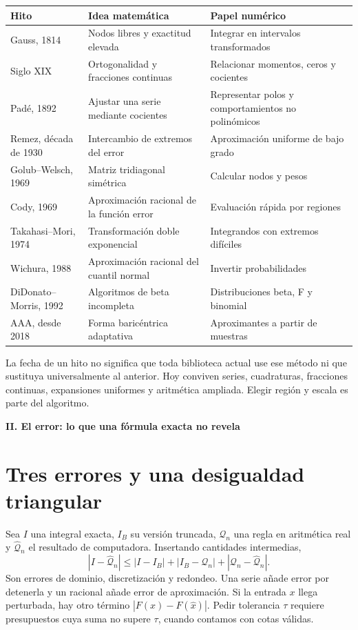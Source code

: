 \documentclass[11pt,a4paper]{article}
\theoremstyle{definition}
\newcommand{\parte}[1]{\par\bigskip\Needspace{8\baselineskip}\begin{center}{\Large\bfseries\color{azul}#1}\end{center}}
\begin{document}
\begin{center}\small
\begin{tabular}{>{\raggedright\arraybackslash}p{2cm}>{\raggedright\arraybackslash}p{5.3cm}>{\raggedright\arraybackslash}p{7.3cm}}
\toprule Hito & Idea matemática & Papel numérico\\\midrule
Gauss, 1814 & Nodos libres y exactitud elevada & Integrar en intervalos transformados\\
Siglo XIX & Ortogonalidad y fracciones continuas & Relacionar momentos, ceros y cocientes\\
Padé, 1892 & Ajustar una serie mediante cocientes & Representar polos y comportamientos no polinómicos\\
Remez, década de 1930 & Intercambio de extremos del error & Aproximación uniforme de bajo grado\\
Golub--Welsch, 1969 & Matriz tridiagonal simétrica & Calcular nodos y pesos\\
Cody, 1969 & Aproximación racional de la función error & Evaluación rápida por regiones\\
Takahasi--Mori, 1974 & Transformación doble exponencial & Integrandos con extremos difíciles\\
Wichura, 1988 & Aproximación racional del cuantil normal & Invertir probabilidades\\
DiDonato--Morris, 1992 & Algoritmos de beta incompleta & Distribuciones beta, F y binomial\\
AAA, desde 2018 & Forma baricéntrica adaptativa & Aproximantes a partir de muestras\\
\bottomrule
\end{tabular}
\end{center}
La fecha de un hito no significa que toda biblioteca actual use ese método ni que sustituya universalmente al anterior. Hoy conviven series, cuadraturas, fracciones continuas, expansiones uniformes y aritmética ampliada. Elegir región y escala es parte del algoritmo.

\parte{II. El error: lo que una fórmula exacta no revela}
\section{Tres errores y una desigualdad triangular}
Sea $I$ una integral exacta, $I_B$ su versión truncada, $\mathcal Q_n$ una regla en aritmética real y $\widehat{\mathcal Q}_n$ el resultado de computadora. Insertando cantidades intermedias,
\[
|I-\widehat{\mathcal Q}_n|
\le |I-I_B|+|I_B-\mathcal Q_n|+|\mathcal Q_n-\widehat{\mathcal Q}_n|.
\]
Son errores de dominio, discretización y redondeo. Una serie añade error por detenerla y un racional añade error de aproximación. Si la entrada $x$ llega perturbada, hay otro término $|F(x)-F(\widehat x)|$. Pedir tolerancia $\tau$ requiere presupuestos cuya suma no supere $\tau$, cuando contamos con cotas válidas.
\end{document}
